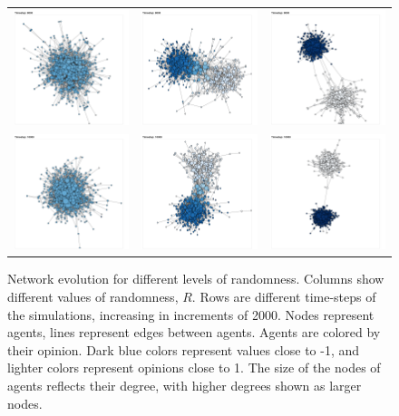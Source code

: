 \documentclass[11pt]{article}
\begin{document}
\begin{center}
\begin{figure}[H]
\begin{tabular}{ccc}
    \includegraphics[width=.18\linewidth]{../plots/networks/network_example_R0.1_8000.png} & \includegraphics[width=.18\linewidth]{../plots/networks/network_example_R0.3_8000.png} & \includegraphics[width=.18\linewidth]{../plots/networks/network_example_R0.5_8000.png}\\  
    \includegraphics[width=.18\linewidth]{../plots/networks/network_example_R0.1_10000.png} & \includegraphics[width=.18\linewidth]{../plots/networks/network_example_R0.3_10000.png} & \includegraphics[width=.18\linewidth]{../plots/networks/network_example_R0.5_10000.png}\\  
    \end{tabular} 
    \caption{Network evolution for different levels of randomness. Columns show different values of randomness, $R$. Rows are different time-steps of the simulations, increasing in increments of 2000. Nodes represent agents, lines represent edges between agents. Agents are colored by their opinion. Dark blue colors represent values close to -1, and lighter colors represent opinions close to 1. The size of the nodes of agents reflects their degree, with higher degrees shown as larger nodes.} 
    \label{fig:networks} 
    \end{figure} 
\end{center} 
\end{document}
